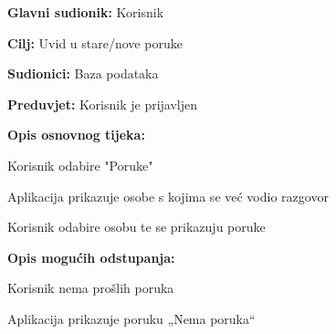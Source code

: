 				\noindent {}
				\begin{packed_item}

					\item \textbf{Glavni sudionik: }Korisnik
					\item  \textbf{Cilj:} Uvid u stare/nove poruke
					\item  \textbf{Sudionici:} Baza podataka
					\item  \textbf{Preduvjet:} Korisnik je prijavljen
					\item  \textbf{Opis osnovnog tijeka:}
					
					\item[] \begin{packed_enum}

							\item Korisnik odabire "Poruke"
							\item Aplikacija prikazuje osobe s kojima se već vodio razgovor
							\item Korisnik odabire osobu te se prikazuju poruke
					\end{packed_enum}
				
					\item  \textbf{Opis mogućih odstupanja:}
				
					\item[] \begin{packed_item}

						\item[2.a] Korisnik nema prošlih poruka
						\item[] \begin{packed_enum}
							\item Aplikacija prikazuje poruku „Nema poruka“
						\end{packed_enum}
					\end{packed_item}
				\end{packed_item}

